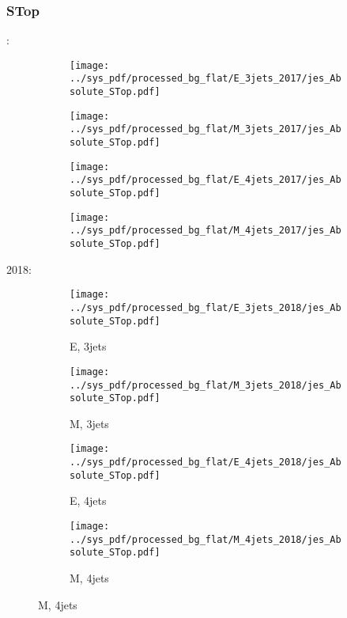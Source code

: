 \documentclass{beamer}
\begin{document}
\begin{frame}
\frametitle{STop}
\fontsize{5}{1}:
\begin{figure}
\centering
\begin{subfigure}[b]{0.24\textwidth}
\texttt{[image: ../sys\_pdf/processed\_bg\_flat/E\_3jets\_2017/jes\_Absolute\_STop.pdf]}
\end{subfigure}
\begin{subfigure}[b]{0.24\textwidth}
\texttt{[image: ../sys\_pdf/processed\_bg\_flat/M\_3jets\_2017/jes\_Absolute\_STop.pdf]}
\end{subfigure}
\begin{subfigure}[b]{0.24\textwidth}
\texttt{[image: ../sys\_pdf/processed\_bg\_flat/E\_4jets\_2017/jes\_Absolute\_STop.pdf]}
\end{subfigure}
\begin{subfigure}[b]{0.24\textwidth}
\texttt{[image: ../sys\_pdf/processed\_bg\_flat/M\_4jets\_2017/jes\_Absolute\_STop.pdf]}
\end{subfigure}
\end{figure}
2018:
\begin{figure}
\centering
\begin{subfigure}[b]{0.24\textwidth}
\texttt{[image: ../sys\_pdf/processed\_bg\_flat/E\_3jets\_2018/jes\_Absolute\_STop.pdf]}
\captionsetup{font=tiny}
\caption{E, 3jets}
\end{subfigure}
\begin{subfigure}[b]{0.24\textwidth}
\texttt{[image: ../sys\_pdf/processed\_bg\_flat/M\_3jets\_2018/jes\_Absolute\_STop.pdf]}
\captionsetup{font=tiny}
\caption{M, 3jets}
\end{subfigure}
\begin{subfigure}[b]{0.24\textwidth}
\texttt{[image: ../sys\_pdf/processed\_bg\_flat/E\_4jets\_2018/jes\_Absolute\_STop.pdf]}
\captionsetup{font=tiny}
\caption{E, 4jets}
\end{subfigure}
\begin{subfigure}[b]{0.24\textwidth}
\texttt{[image: ../sys\_pdf/processed\_bg\_flat/M\_4jets\_2018/jes\_Absolute\_STop.pdf]}
\captionsetup{font=tiny}
\caption{M, 4jets}
\end{subfigure}
\end{figure}
\end{frame}
\end{document}
